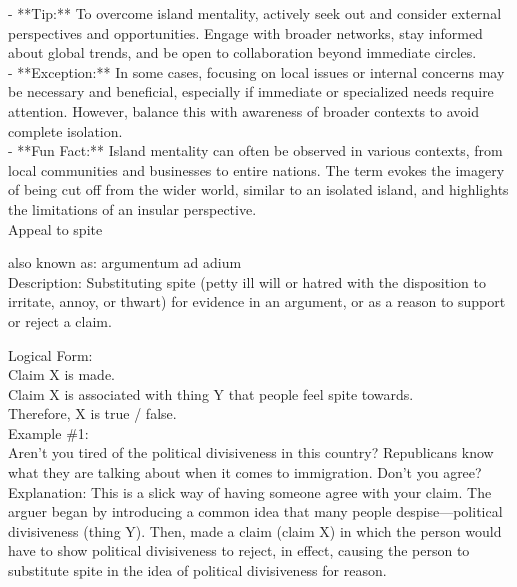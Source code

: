 \documentclass[a4paper,12pt,single,pdftex]{scrbook}
\begin{document}
    
      - **Tip:** To overcome island mentality, actively seek out and consider external perspectives and opportunities. Engage with broader networks, stay informed about global trends, and be open to collaboration beyond immediate circles.
    \\

    
      - **Exception:** In some cases, focusing on local issues or internal concerns may be necessary and beneficial, especially if immediate or specialized needs require attention. However, balance this with awareness of broader contexts to avoid complete isolation.
    \\

    
      - **Fun Fact:** Island mentality can often be observed in various contexts, from local communities and businesses to entire nations. The term evokes the imagery of being cut off from the wider world, similar to an isolated island, and highlights the limitations of an insular perspective.
    \\

  

Appeal to spite
    
      also known as: argumentum ad adium
    \\

  
    Description: Substituting spite (petty ill will or hatred with the disposition to irritate, annoy, or thwart) for evidence in an argument, or as a reason to support or reject a claim.

    
      Logical Form:
    \\

    
      Claim X is made.
    \\

    
      Claim X is associated with thing Y that people feel spite towards.
    \\

    
      Therefore, X is true / false.
    \\

    
      Example \#1:
    \\

    
      Aren't you tired of the political divisiveness in this country? Republicans know what they are talking about when it comes to immigration. Don't you agree?
    \\

    
      Explanation: This is a slick way of having someone agree with your claim. The arguer began by introducing a common idea that many people despise—political divisiveness (thing Y). Then, made a claim (claim X) in which the person would have to show political divisiveness to reject, in effect, causing the person to substitute spite in the idea of political divisiveness for reason.
    \\
\end{document}
